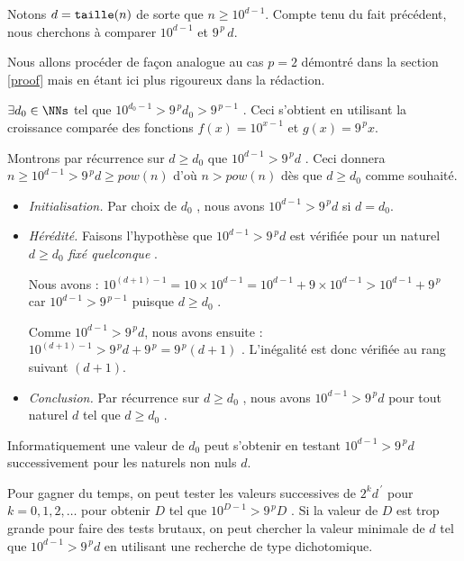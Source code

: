 \begin{proof*}\label{magicmajo-proof}
	Notons $d = \operatorname{\text{\normalfont\texttt{taille}}}(n)$ de sorte que $n \geqslant 10^{d-1}$.
	Compte tenu du fait précédent, nous cherchons à comparer $10^{d-1}$ et $9^{\,p} \, d$.
	
	
	\medskip
	
	Nous allons procéder de façon analogue au cas $p = 2$ démontré dans la section \ref{proof} mais en étant ici plus rigoureux dans la rédaction.
	
	
	\medskip
	
	$\exists d_0 \in \NNs$ tel que $10^{d_0 - 1} > 9^{\,p} d_0 > 9^{\,p  - 1}$ . Ceci s'obtient en utilisant la croissance comparée des fonctions $f(x) = 10^{x - 1}$ et $g(x) = 9^{\,p} x$.


	\medskip
	
	Montrons par récurrence sur $d \geqslant d_0$ que $10^{d - 1} > 9^{\,p} d$ .
	Ceci donnera $n \geqslant 10^{d - 1} > 9^{\,p} d \geqslant pow(n)$ d'où $n > pow(n)$ dès que $d \geqslant d_0$ comme souhaité.

	\begin{itemize}[label=\small\textbullet]
		\item \emph{Initialisation.}
		Par choix de $d_0$ , nous avons $10^{d-1} > 9^{\,p} d$ si $d = d_0$.

		\item \emph{Hérédité.}
		Faisons l'hypothèse que $10^{d-1} > 9^{\,p} d$ est vérifiée pour un naturel $d \geqslant d_0$ \emph{\og fixé quelconque \fg}.

		\smallskip
		
		\noindent
		Nous avons : $10^{(d+1)-1} = 10\times10^{d-1} = 10^{d-1} + 9\times10^{d-1} > 10^{d-1} + 9^{\,p}$ car $10^{d-1} > 9^{\,p  - 1}$ puisque $d \geqslant d_0$ .

		\smallskip
		
		\noindent
		Comme $10^{d-1} > 9^{\,p} d$, nous avons ensuite : $10^{(d+1)-1} > 9^{\,p} d + 9^{\,p} = 9^{\,p} (d+ 1)$ .
		L'inégalité est donc vérifiée au rang suivant $(d+1)$. 

		\item \emph{Conclusion.}
		Par récurrence sur $d \geqslant d_0$ , nous avons $10^{d - 1} > 9^{\,p} d$ pour tout naturel $d$ tel que $d \geqslant d_0$ .
	\end{itemize}
\end{proof*}
	

\medskip

\begin{remark}
	Informatiquement une valeur de $d_0$ peut s'obtenir en testant $10^{d - 1} > 9^{\,p} d$ successivement pour les naturels non nuls $d$.
	
	
	\medskip
	
	Pour gagner du temps, on peut tester les valeurs successives de $2^k d^{\,\prime}$ pour $k = 0, 1, 2, \dots$ pour obtenir $D$ tel que $10^{D - 1} > 9^{\,p} D$ . Si la valeur de $D$ est trop grande pour faire des tests brutaux, on peut chercher la valeur minimale de $d$ tel que $10^{d - 1} > 9^{\,p} d$ en utilisant une recherche de type dichotomique. 
\end{remark}


